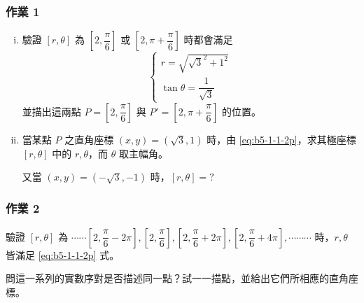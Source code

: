 \subsubsection*{作業 1}
\begin{enumerate}[(i)]
  \item 驗證 $[r, \theta]$ 為 $\left[2, \dfrac{\pi}{6}\right]$ 或 $\left[2, \pi + \dfrac{\pi}{6}\right]$ 時都會滿足
  \begin{equation}
  \begin{cases}
  r = \sqrt{\sqrt{3}^2 + 1^2} \\[4pt]
  \tan\theta = \dfrac{1}{\sqrt{3}}
  \end{cases} \tag{$2'$} \label{eq:b5-1-1-2p}
  \end{equation}
  並描出這兩點 $P = \left[2, \dfrac{\pi}{6}\right]$ 與 $P' = \left[2, \pi + \dfrac{\pi}{6}\right]$ 的位置。
  \item 當某點 $P$ 之直角座標 $(x, y) = (\sqrt{3}, 1)$ 時，由 \eqref{eq:b5-1-1-2p}，求其極座標 $[r, \theta]$ 中的 $r, \theta$，而 $\theta$ 取主幅角。

  又當 $(x, y) = (-\sqrt{3}, -1)$ 時，$[r, \theta] = ?$
\end{enumerate}

\subsubsection*{作業 2}
驗證 $[r, \theta]$ 為 $\cdots\cdots \left[2, \dfrac{\pi}{6} - 2\pi\right], \left[2, \dfrac{\pi}{6}\right], \left[2, \dfrac{\pi}{6} + 2\pi\right], \left[2, \dfrac{\pi}{6} + 4\pi\right], \cdots\cdots\cdots$ 時，$r, \theta$ 皆滿足 \eqref{eq:b5-1-1-2p} 式。

問這一系列的實數序對是否描述同一點？試一一描點，並給出它們所相應的直角座標。

